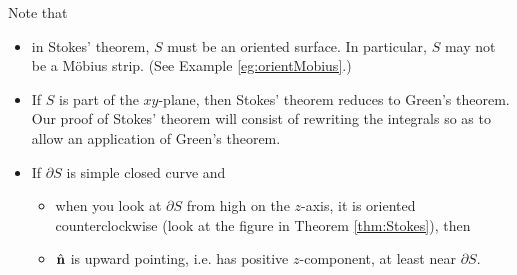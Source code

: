 Note that
\begin{itemize}
\item
in Stokes' theorem, $S$ must be an oriented surface. In particular, $S$ may not be a M\"obius strip. (See Example \ref{eg:orientMobius}.)
\item
If $S$ is part of the $xy$-plane, then Stokes' theorem reduces to Green's
theorem. Our proof of Stokes' theorem will consist of rewriting the integrals 
so as to allow an application of Green's theorem.
\item
If $\partial S$ is simple closed curve and
\begin{itemize}
\item
when you look at $\partial S$ from high on the $z$-axis, it is oriented
counterclockwise (look at the figure in Theorem \ref{thm:Stokes}), then
\item 
$\hat{\mathbf{n}}$ is upward pointing, i.e. has positive $z$-component, at least near 
$\partial S$.
\end{itemize}
\end{itemize}


